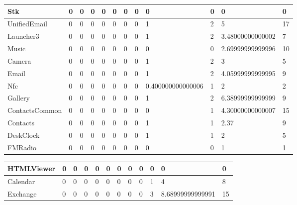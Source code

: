 \begin{tabular}{|l|l|l|l|l|l|l|l|l|l|l|l|}
\hline
Stk&0&0&0&0&0&0&0&0&0&0&0\\
\hline
UnifiedEmail&0&0&0&0&0&0&0&1&2&5&17\\
\hline
Launcher3&0&0&0&0&0&0&0&1&2&3.48000000000002&7\\
\hline
Music&0&0&0&0&0&0&0&0&0&2.69999999999996&10\\
\hline
Camera&0&0&0&0&0&0&0&1&2&3&5\\
\hline
Email&0&0&0&0&0&0&0&1&2&4.05999999999995&9\\
\hline
Nfc&0&0&0&0&0&0&0&0.400000000000006&1&2&2\\
\hline
Gallery&0&0&0&0&0&0&0&1&2&6.38999999999999&9\\
\hline
ContactsCommon&0&0&0&0&0&0&0&0&1&4.30000000000007&15\\
\hline
Contacts&0&0&0&0&0&0&0&1&1&2.37&9\\
\hline
DeskClock&0&0&0&0&0&0&0&1&1&2&5\\
\hline
FMRadio&0&0&0&0&0&0&0&0&0&1&1\\
\hline
\end{tabular}
\newline
\begin{tabular}{|l|l|l|l|l|l|l|l|l|l|l|l|}
\hline
HTMLViewer&0&0&0&0&0&0&0&0&0&0&0\\
\hline
Calendar&0&0&0&0&0&0&0&0&1&4&8\\
\hline
Exchange&0&0&0&0&0&0&0&0&3&8.68999999999991&15\\
\hline
\end{tabular}
